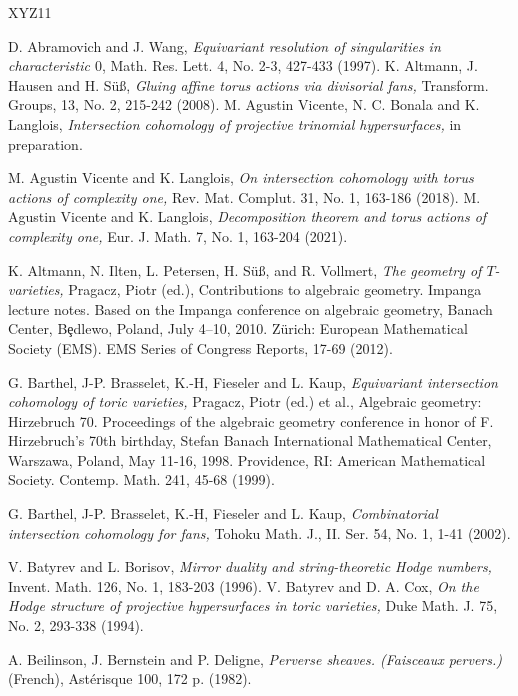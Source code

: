 \documentclass[11pt, reqno]{amsart}
\theoremstyle{plain}
\theoremstyle{definition}
\theoremstyle{remark}
\begin{document}
\begin{thebibliography}{XYZ11}

  D. Abramovich and J. Wang, \emph{Equivariant resolution of singularities in characteristic $0$}, Math. Res. Lett.  4, No. 2-3, 427-433 (1997).
 K. Altmann, J. Hausen and H. S\"u{\ss}, \emph{Gluing affine torus actions via divisorial 
fans,} Transform. Groups, 13, No. 2, 215-242 (2008). 
M. Agustin Vicente, N. C. Bonala and K. Langlois, \emph{Intersection cohomology of projective trinomial hypersurfaces,} in preparation.



M. Agustin Vicente and K. Langlois, \emph{On intersection cohomology with torus actions of complexity one,}   Rev. Mat. Complut. 31, No. 1, 163-186 (2018). 
 M. Agustin Vicente and K. Langlois, \emph{Decomposition theorem and torus actions of complexity one,}
Eur. J. Math. 7, No. 1, 163-204 (2021). 


K. Altmann, N. Ilten, L. Petersen, H. S\"u{\ss}, and R. Vollmert, \emph{The geometry of $T$-varieties,} Pragacz, Piotr (ed.), Contributions to algebraic geometry. Impanga lecture notes. Based on the Impanga conference on algebraic geometry, Banach Center, B\c edlewo, Poland, July 4--10, 2010. Z\"urich: European Mathematical Society (EMS). EMS Series of Congress Reports, 17-69 (2012). 


G. Barthel, J-P. Brasselet, K.-H, Fieseler and L. Kaup,  \emph{Equivariant intersection cohomology of toric varieties,} Pragacz, Piotr (ed.) et al., Algebraic geometry: Hirzebruch 70. Proceedings of the algebraic geometry conference in honor of F. Hirzebruch's 70th birthday, Stefan Banach International Mathematical Center, Warszawa, Poland, May 11-16, 1998. Providence, RI: American Mathematical Society. Contemp. Math. 241, 45-68 (1999). 

G. Barthel, J-P. Brasselet, K.-H, Fieseler and L. Kaup,  \emph{Combinatorial intersection cohomology for fans,}
Tohoku Math. J., II. Ser. 54, No. 1, 1-41 (2002). 

V. Batyrev and L. Borisov, \emph{Mirror duality and string-theoretic Hodge numbers,} Invent. Math. 126, No. 1, 183-203 (1996).
V. Batyrev and D. A. Cox, 
\emph{On the Hodge structure of projective hypersurfaces in toric varieties,} Duke Math. J. 75, No. 2, 293-338 (1994). 


 A. Beilinson, J. Bernstein and P. Deligne, \emph{Perverse sheaves. (Faisceaux pervers.)} (French),
Ast\'erisque 100, 172 p. (1982). 
 

\end{thebibliography}
\end{document}
